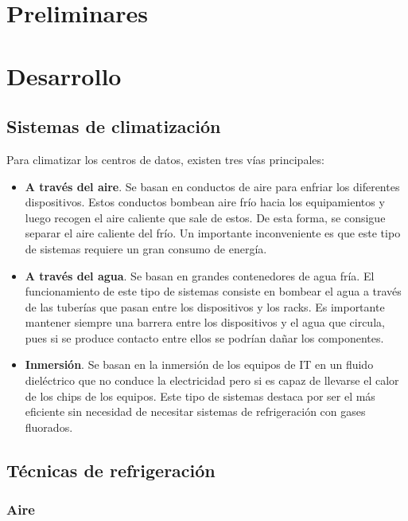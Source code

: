 \chapter{Preliminares}

\chapter{Desarrollo}

\section{Sistemas de climatización}

Para climatizar los centros de datos, existen tres vías principales:

\begin{itemize}
    \item \textbf{A través del aire}. Se basan en conductos de aire para enfriar los diferentes dispositivos. Estos conductos bombean aire frío hacia los equipamientos y luego recogen el aire caliente que sale de estos. De esta forma, se consigue separar el aire caliente del frío. Un importante inconveniente es que este tipo de sistemas requiere un gran consumo de energía.
    \item \textbf{A través del agua}. Se basan en grandes contenedores de agua fría. El funcionamiento de este tipo de sistemas consiste en bombear el agua a través de las tuberías que pasan entre los dispositivos y los racks. Es importante mantener siempre una barrera entre los dispositivos y el agua que circula, pues si se produce contacto entre ellos se podrían dañar los componentes.
    \item \textbf{Inmersión}. Se basan en la inmersión de los equipos de IT en un fluido dieléctrico que no conduce la electricidad pero si es capaz de llevarse el calor de los chips de los equipos. Este tipo de sistemas destaca por ser el más eficiente sin necesidad de necesitar sistemas de refrigeración con gases fluorados.
\end{itemize}

\section{Técnicas de refrigeración}

\subsection{Aire}

